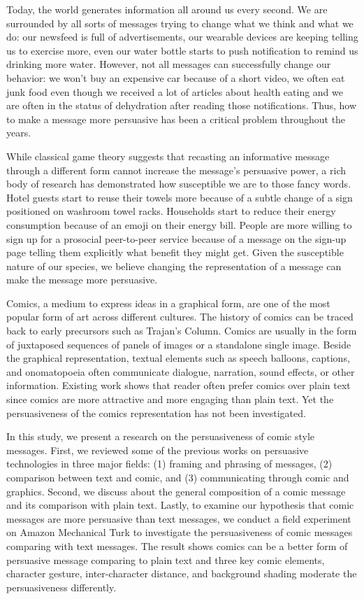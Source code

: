 Today, the world generates information all around us every second. We are surrounded by all sorts of messages trying to change what we think and what we do: our newsfeed is full of advertisements, our wearable devices are keeping telling us to exercise more, even our water bottle starts to push notification to remind us drinking more water. However, not all messages can successfully change our behavior: we won't buy an expensive car because of a short video, we often eat junk food even though we received a lot of articles about health eating and we are often in the status of dehydration after reading those notifications. Thus, how to make a message more persuasive has been a critical problem throughout the years.\par
While classical game theory suggests that recasting an informative message through a different form cannot increase the message's persuasive power, a rich body of research has demonstrated how susceptible we are to those fancy words. Hotel guests start to reuse their towels more because of a subtle change of a sign positioned on washroom towel racks. Households start to reduce their energy consumption because of an emoji on their energy bill. People are more willing to sign up for a prosocial peer-to-peer service because of a message on the sign-up page telling them explicitly what benefit they might get. Given the susceptible nature of our species, we believe changing the representation of a message can make the message more persuasive.\par
Comics, a medium to express ideas in a graphical form, are one of the most popular form of art across different cultures. The history of comics can be traced back to early precursors such as Trajan’s Column. Comics are usually in the form of juxtaposed sequences of panels of images or a standalone single image. Beside the graphical representation, textual elements such as speech balloons, captions, and onomatopoeia often communicate dialogue, narration, sound effects, or other information. Existing work shows that reader often prefer comics over plain text since comics are more attractive and more engaging than plain text. Yet the persuasiveness of the comics representation has not been investigated.\par
In this study, we present a research on the persuasiveness of comic style messages. First, we reviewed some of the previous works on persuasive technologies in three major fields: (1) framing and phrasing of messages, (2) comparison between text and comic, and (3) communicating through comic and graphics. Second, we discuss about the general composition of a comic message and its comparison with plain text. Lastly, to examine our hypothesis that comic messages are more persuasive than text messages, we conduct a field experiment on Amazon Mechanical Turk to investigate the persuasiveness of comic messages comparing with text messages. The result shows comics can be a better form of persuasive message comparing to plain text and three key comic elements, character gesture, inter-character distance, and background shading moderate the persuasiveness differently.\par

